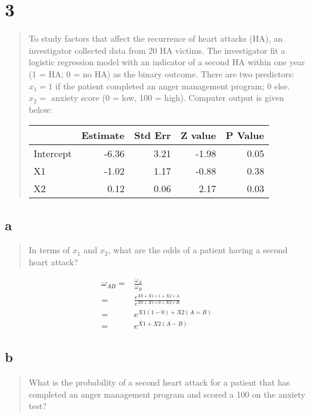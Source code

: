 \documentclass[11pt]{article}
\begin{document}
\section{3}
\label{sec:org1b9402a}
\begin{quote}
To study factors that affect the recurrence of heart attacks (HA), an
investigator collected data from 20 HA victims. The investigator fit a logistic regression model with an indicator of a second
HA within one year (1 = HA; 0 = no HA) as the binary outcome. There are two
predictors: \(x_1 = 1\) if the patient completed an anger management program; 0
else. \(x_2 =\) anxiety score (0 = low, 100 = high). Computer output is given
below:

\begin{center}
\begin{tabular}{lrrrr}
 & Estimate & Std Err & Z value & P Value\\
\hline
Intercept & -6.36 & 3.21 & -1.98 & 0.05\\
X1 & -1.02 & 1.17 & -0.88 & 0.38\\
X2 & 0.12 & 0.06 & 2.17 & 0.03\\
\end{tabular}
\end{center}
\end{quote}

\subsection{a}
\label{sec:orgc87dcff}
\begin{quote}
In terms of \(x_1\) and \(x_2\), what are the odds of a patient having a second
heart attack?
\end{quote}

\begin{equation}
\begin{split}
\omega_{AB} = & \frac{\omega_A}{\omega_B}\\
= & \frac{e^{X0 + X1 \times 1 + X2 \times A}}{e^{X0 + X1 \times 0 + X2 \times B}}\\
= & e^{X1 (1 - 0) + X2(A = B)}\\
= & e^{X1 + X2 (A - B)}
\end{split}
\end{equation}

\subsection{b}
\label{sec:org43fb698}
\begin{quote}
What is the probability of a second heart attack for a patient that has
completed an anger management program and scored a 100 on the anxiety test?
\end{quote}
\end{document}
